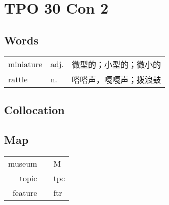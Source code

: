\section{TPO 30 Con 2}

\subsection{Words}

\begin{tabular}{lll}
    miniature & adj. & 微型的；小型的；微小的 \\
    rattle    & n.   & 嗒嗒声，嘎嘎声；拨浪鼓 \\
\end{tabular}

\subsection{Collocation}

\subsection{Map}

\begin{tabular}{rc@{\quad$\to$\quad}l}
    museum  &  & \textcircled{M} \\
    topic   &  & tpc             \\
    feature &  & ftr             \\
\end{tabular}

\newpage

